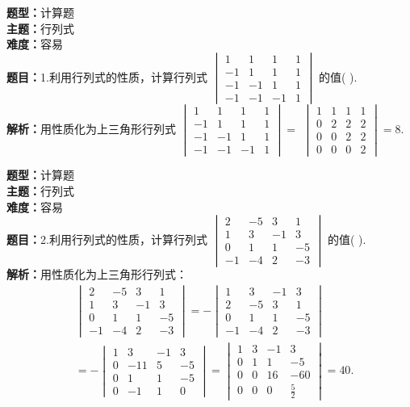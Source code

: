 \documentclass{ctexart}
\newenvironment{question}[5]{%
	\noindent\textbf{题型：}#1\\
	\textbf{主题：}#2\\
	\textbf{难度：}#3\\
	\textbf{题目：}#4\\
	\textbf{解析：}#5\\
	\vspace{1em}
}{}
\begin{document}
	
	\begin{question}
		{计算题}
		{行列式}
		{容易}
		{1.利用行列式的性质，计算行列式 \(\begin{vmatrix}1 & 1 & 1 & 1 \\ -1 & 1 & 1 & 1 \\ -1 & -1 & 1 & 1 \\ -1 & -1 & -1 & 1\end{vmatrix}\) 的值(  ).}
		{用性质化为上三角形行列式 \(\begin{vmatrix}1 & 1 & 1 & 1 \\ -1 & 1 & 1 & 1 \\ -1 & -1 & 1 & 1 \\ -1 & -1 & -1 & 1\end{vmatrix}=\) \(\begin{vmatrix}1 & 1 & 1 & 1 \\ 0 & 2 & 2 & 2 \\ 0 & 0 & 2 & 2 \\ 0 & 0 & 0 & 2\end{vmatrix}=8\).}
	\end{question}	
	
	
	\begin{question}
		{计算题}
		{行列式}
		{容易}
		{2.利用行列式的性质，计算行列式 \(\begin{vmatrix}2 & -5 & 3 & 1 \\ 1 & 3 & -1 & 3 \\ 0 & 1 & 1 & -5 \\ -1 & -4 & 2 & -3\end{vmatrix}\) 的值(  ).}
		{用性质化为上三角形行列式：
			\[
			\begin{aligned}
				&\begin{vmatrix}
					2 & -5 & 3 & 1 \\
					1 & 3 & -1 & 3 \\
					0 & 1 & 1 & -5 \\
					-1 & -4 & 2 & -3
				\end{vmatrix}
				= -\begin{vmatrix}
					1 & 3 & -1 & 3 \\
					2 & -5 & 3 & 1 \\
					0 & 1 & 1 & -5 \\
					-1 & -4 & 2 & -3
				\end{vmatrix} \\
				&= -\begin{vmatrix}
					1 & 3 & -1 & 3 \\
					0 & -11 & 5 & -5 \\
					0 & 1 & 1 & -5 \\
					0 & -1 & 1 & 0
				\end{vmatrix}
				= \begin{vmatrix}
					1 & 3 & -1 & 3 \\
					0 & 1 & 1 & -5 \\
					0 & 0 & 16 & -60 \\
					0 & 0 & 0 & \frac{5}{2}
				\end{vmatrix} = 40.
			\end{aligned}
			\]}
	\end{question}
	
\end{document}
